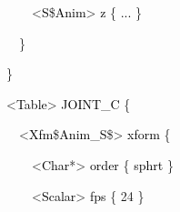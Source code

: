 \documentclass[a4paper]{article}
\newcommand\textstyleOOoComputerKeyWord[1]{\textrm{\textcolor[rgb]{0.0,0.0,0.5019608}{#1}}}
\newcommand\textstyleOOoAssemblerSpecialChar[1]{\textrm{\textcolor[rgb]{0.0,0.5019608,0.0}{#1}}}
\newcommand\textstyleOOoAssemblerIdent[1]{\textrm{\textcolor{black}{#1}}}
\newcommand\textstyleOOoAssemblerLiteral[1]{\textrm{\textcolor[rgb]{0.49803922,0.0,0.49803922}{#1}}}
\begin{document}
{\color{black}
\textstyleOOoComputerKeyWord{\textcolor{black}{\ \ \ \ \ \ \ \ \ \ \ \ }}\textstyleOOoAssemblerSpecialChar{{\textless}}\textstyleOOoAssemblerIdent{S}\textstyleOOoAssemblerSpecialChar{\$}\textstyleOOoAssemblerIdent{Anim}\textstyleOOoAssemblerSpecialChar{{\textgreater}}\textstyleOOoComputerKeyWord{\textcolor{black}{
}}\textstyleOOoAssemblerIdent{z}\textstyleOOoComputerKeyWord{\textcolor{black}{
}}\textstyleOOoAssemblerSpecialChar{\{}\textstyleOOoComputerKeyWord{\textcolor{black}{
}}\textstyleOOoAssemblerIdent{...}\textstyleOOoComputerKeyWord{\textcolor{black}{
}}\textstyleOOoAssemblerSpecialChar{\}}}

{\color{black}
\textstyleOOoComputerKeyWord{\textcolor{black}{\ \ \ \ \ \ \ \ \ \ }}\textstyleOOoAssemblerSpecialChar{\}}}

{\color{black}
\textstyleOOoComputerKeyWord{\textcolor{black}{\ \ \ \ \ \ \ \ }}\textstyleOOoAssemblerSpecialChar{\}}}

{\color{black}
\textstyleOOoComputerKeyWord{\textcolor{black}{\ \ \ \ \ \ \ \ }}\textstyleOOoAssemblerSpecialChar{{\textless}}\textstyleOOoAssemblerIdent{Table}\textstyleOOoAssemblerSpecialChar{{\textgreater}}\textstyleOOoComputerKeyWord{\textcolor{black}{
}}\textstyleOOoAssemblerIdent{JOINT\_C}\textstyleOOoComputerKeyWord{\textcolor{black}{
}}\textstyleOOoAssemblerSpecialChar{\{}}

{\color{black}
\textstyleOOoComputerKeyWord{\textcolor{black}{\ \ \ \ \ \ \ \ \ \ }}\textstyleOOoAssemblerSpecialChar{{\textless}}\textstyleOOoAssemblerIdent{Xfm}\textstyleOOoAssemblerSpecialChar{\$}\textstyleOOoAssemblerIdent{Anim\_S}\textstyleOOoAssemblerSpecialChar{\${\textgreater}}\textstyleOOoComputerKeyWord{\textcolor{black}{
}}\textstyleOOoAssemblerIdent{xform}\textstyleOOoComputerKeyWord{\textcolor{black}{
}}\textstyleOOoAssemblerSpecialChar{\{}}

{\color{black}
\textstyleOOoComputerKeyWord{\textcolor{black}{\ \ \ \ \ \ \ \ \ \ \ \ }}\textstyleOOoAssemblerSpecialChar{{\textless}}\textstyleOOoAssemblerIdent{Char}\textstyleOOoAssemblerSpecialChar{*{\textgreater}}\textstyleOOoComputerKeyWord{\textcolor{black}{
}}\textstyleOOoAssemblerIdent{order}\textstyleOOoComputerKeyWord{\textcolor{black}{
}}\textstyleOOoAssemblerSpecialChar{\{}\textstyleOOoComputerKeyWord{\textcolor{black}{
}}\textstyleOOoAssemblerIdent{sphrt}\textstyleOOoComputerKeyWord{\textcolor{black}{
}}\textstyleOOoAssemblerSpecialChar{\}}}

{\color{black}
\textstyleOOoComputerKeyWord{\textcolor{black}{\ \ \ \ \ \ \ \ \ \ \ \ }}\textstyleOOoAssemblerSpecialChar{{\textless}}\textstyleOOoAssemblerIdent{Scalar}\textstyleOOoAssemblerSpecialChar{{\textgreater}}\textstyleOOoComputerKeyWord{\textcolor{black}{
}}\textstyleOOoAssemblerIdent{fps}\textstyleOOoComputerKeyWord{\textcolor{black}{
}}\textstyleOOoAssemblerSpecialChar{\{}\textstyleOOoComputerKeyWord{\textcolor{black}{
}}\textstyleOOoAssemblerLiteral{24}\textstyleOOoComputerKeyWord{\textcolor{black}{
}}\textstyleOOoAssemblerSpecialChar{\}}}
\end{document}
